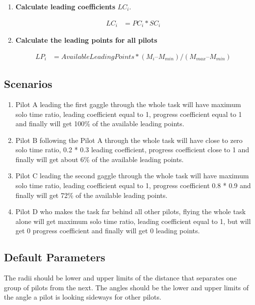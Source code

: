 \documentclass[gap.tex]{subfiles}
\begin{document}
\begin{enumerate}
    \item \textbf{Calculate leading coefficients} \(LC_i\).
        
        \begin{align*}
            LC_i &= PC_i * SC_i
        \end{align*}
            
    \item \textbf{Calculate the leading points for all pilots}
        
        \begin{align*}
            LP_i &= AvailableLeadingPoints * (M_i – M_{min}) / (M_{max} – M_{min} )
        \end{align*}
\end{enumerate}

\subsection{Scenarios}

\begin{enumerate}
    \item Pilot A leading the first gaggle through the whole task will have
        maximum solo time ratio, leading coefficient equal to 1, progress
        coefficient equal to 1 and finally will get 100\% of the available
        leading points.

    \item Pilot B following the Pilot A through the whole task will have close
        to zero solo time ratio, 0.2 * 0.3 leading coefficient, progress
        coefficient close to 1 and finally will get about 6\% of the available
        leading points.

    \item Pilot C leading the second gaggle through the whole task will have
        maximum solo time ratio, leading coefficient equal to 1, progress
        coefficient 0.8 * 0.9 and finally will get 72\% of the available
        leading points.

    \item Pilot D who makes the task far behind all other pilots, flying the
        whole task alone will get maximum solo time ratio, leading coefficient
        equal to 1, but will get 0 progress coefficient and finally will get
        0 leading points.
\end{enumerate}

\subsection{Default Parameters}
The radii should be lower and upper limits of the distance that separates one
group of pilots from the next. The angles should be the lower and upper limits
of the angle a pilot is looking sideways for other pilots.
\end{document}
